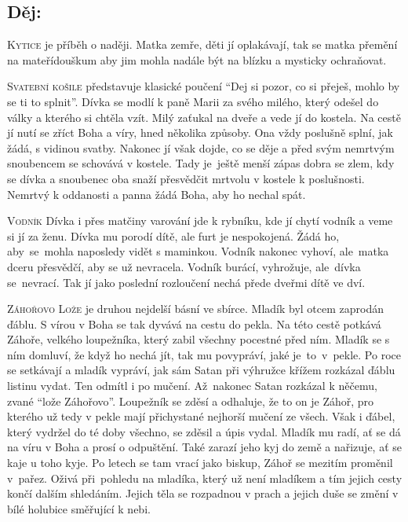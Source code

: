 \documentclass{extarticle} %
\begin{document}
\subsection*{Děj:}
{\setlength{\parindent}{5pt}
\textsc{Kytice} je příběh o naději. Matka zemře, děti jí oplakávají, tak se matka přemění na mateřídouškum aby jim mohla nadále být na blízku a mysticky ochraňovat.

\textsc{Svatební košile} představuje klasické poučení \enquote{Dej si pozor, co si přeješ, mohlo by se ti to splnit}. Dívka se modlí k paně Marii za svého milého, který odešel do války a kterého si chtěla vzít. Milý zaťukal na dveře a vede jí do kostela. Na cestě jí nutí se zříct Boha a víry, hned několika způsoby. Ona vždy poslušně splní, jak žádá, s vidinou svatby. Nakonec jí však dojde, co se děje a před svým nemrtvým snoubencem se schovává v kostele. Tady je~ještě menší zápas dobra se zlem, kdy se dívka a snoubenec oba snaží přesvědčit mrtvolu v kostele k poslušnosti. Nemrtvý k oddanosti a panna žádá Boha, aby ho nechal spát.

\textsc{Vodník} Dívka i přes matčiny varování jde k rybníku, kde jí chytí vodník a veme si jí za ženu. Dívka mu porodí dítě, ale furt je nespokojená. Žádá ho, aby~se~mohla naposledy vidět s maminkou. Vodník nakonec vyhoví, ale~matka dceru přesvědčí, aby se už nevracela. Vodník burácí, vyhrožuje, ale~dívka se~nevrací. Tak jí jako poslední rozloučení nechá přede dveřmi dítě ve dví.

\textsc{Záhořovo Lože} je druhou nejdelší básní ve sbírce. Mladík byl otcem zaprodán ďáblu. S vírou v Boha se tak dyvává na cestu do pekla. Na této cestě potkává Záhoře, velkého loupežníka, který zabil všechny pocestné před ním. Mladík se s ním domluví, že když ho nechá jít, tak mu povypráví, jaké je~to~v~pekle. Po roce se setkávají a mladík vypráví, jak sám Satan při výhružce křížem rozkázal ďáblu listinu vydat. Ten odmítl i po mučení. Až~nakonec Satan rozkázal k něčemu, zvané \enquote{lože Záhořovo}. Loupežník se zděsí a odhaluje, že to on je Záhoř, pro kterého už tedy v pekle mají přichystané nejhorší mučení ze všech. Však i ďábel, který vydržel do té doby všechno, se zděsil a úpis vydal. Mladík mu radí, ať se dá na víru v Boha a prosí o odpuštění. Také zarazí jeho kyj do země a nařizuje, ať se kaje u toho kyje. Po letech se tam vrací jako biskup, Záhoř se mezitím proměnil v~pařez. Oživá při~pohledu na mladíka, který už není mladíkem a tím jejich cesty končí dalším shledáním. Jejich těla se rozpadnou v prach a jejich duše se změní v bílé holubice směřující k nebi.
}
\end{document}
